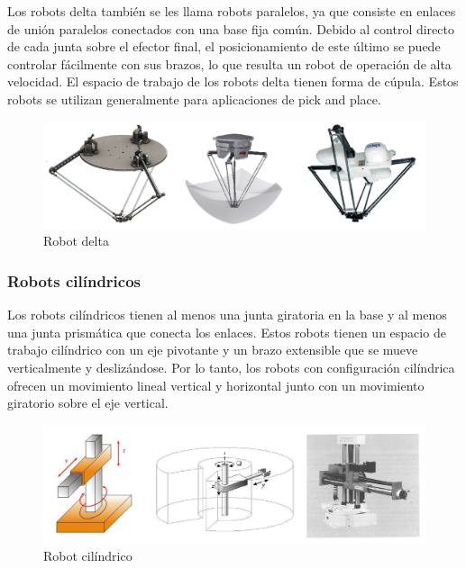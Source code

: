         Los robots delta también se les llama robots paralelos, ya que consiste en enlaces de unión paralelos conectados con una base fija común. Debido al control directo de cada junta sobre el efector final, el posicionamiento de este último se puede controlar fácilmente con sus brazos, lo que resulta un robot de operación de alta velocidad. El espacio de trabajo de los robots delta tienen forma de cúpula. Estos robots se utilizan generalmente para aplicaciones de pick and place.
        
        \begin{figure}[htb]
            \centering
            \includegraphics[width=0.9\linewidth]{Main/Chapter2/Images2/Robot-delta.png}
            \caption{Robot delta}
            \label{f:Cap2_segunMovimiento_delta}
        \end{figure}
        
         \newpage

        
        \subsubsection{Robots cilíndricos}
        
        Los robots cilíndricos tienen al menos una junta giratoria en la base y al menos una junta prismática que conecta los enlaces. Estos robots tienen un espacio de trabajo cilíndrico con un eje pivotante y un brazo extensible que se mueve verticalmente y deslizándose. Por lo tanto, los robots con configuración cilíndrica ofrecen un movimiento lineal vertical y horizontal junto con un movimiento giratorio sobre el eje vertical.
        
        \begin{figure}[htb]
            \centering
            \includegraphics[width=0.9\linewidth]{Main/Chapter2/Images2/Robot-cilindrico.png}
            \caption{Robot cilíndrico}
            \label{f:Cap2_segunMovimiento_cilindrico}
        \end{figure}
        
